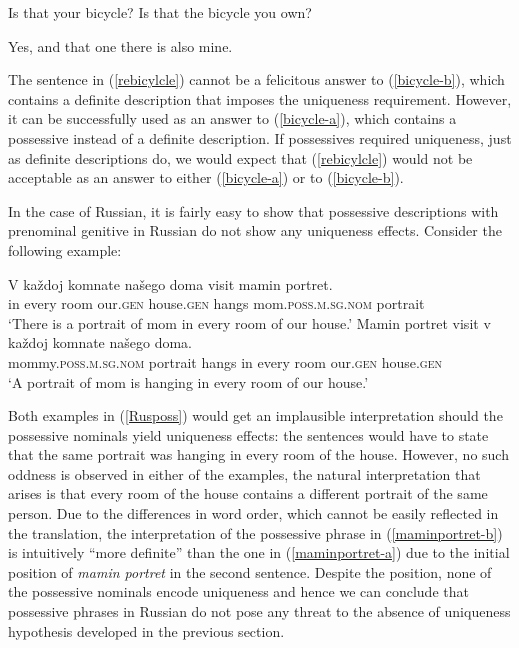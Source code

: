 \documentclass[output=paper,colorlinks,citecolor=brown]{langscibook}
\begin{document}
\ea  
\ea Is that your bicycle? \label{bicycle-a}
\ex Is that the bicycle you own? \label{bicycle-b}
\z
\z

\ea \label{rebicylcle}
Yes, and that one there is also mine. 
\z

\noindent The sentence in (\ref{rebicylcle}) cannot be a felicitous answer to (\ref{bicycle-b}), which contains a definite description that imposes the uniqueness requirement. However, it can be successfully used as an answer to (\ref{bicycle-a}), which contains a possessive instead of a definite description. If possessives required uniqueness, just as definite descriptions do, we would expect that (\ref{rebicylcle}) would not be acceptable as an answer to either (\ref{bicycle-a}) or to (\ref{bicycle-b}). 


In the case of Russian, it is fairly easy to show that possessive descriptions with prenominal genitive in Russian do not show any uniqueness effects. Consider the following example: 

\ea \label{Rusposs}
\ea 	\label{maminportret-a} \gll 
V ka\v{z}doj komnate 	na\v{s}ego 	doma 			visit 		mamin 	portret. \\
		in every	room	 our.\textsc{gen} 	house.\textsc{gen} 	hangs 	mom.\textsc{poss.m.sg.nom}	portrait \\
        \glt `There is a portrait of mom in every room of our house.'
\ex \label{maminportret-b} \gll
Mamin portret visit 		v ka\v{z}doj komnate na\v{s}ego 		doma. 	 \\	
		mommy.\textsc{poss.m.sg.nom} 	portrait hangs in every		room			our.\textsc{gen} 	house.\textsc{gen} \\
\glt `A portrait of mom is hanging in every room of our house.'
\z
\z

\noindent Both examples in (\ref{Rusposs}) would get an implausible interpretation should the possessive nominals yield uniqueness effects: the sentences would have to state that the same portrait was hanging in every room of the house. However, no such oddness is observed in either of the examples, the natural interpretation that arises is that every room of the house contains a different portrait of the same person. Due to the differences in word order, which cannot be easily reflected in the translation, the interpretation of the possessive phrase in (\ref{maminportret-b}) is intuitively  ``more definite'' than the one in (\ref{maminportret-a}) due to the initial position of \textit{mamin portret} in the second sentence. Despite the position, none of the possessive nominals encode uniqueness and hence we can conclude that possessive phrases in Russian do not pose any threat to the absence of uniqueness hypothesis developed in the previous section. 			
\end{document}
